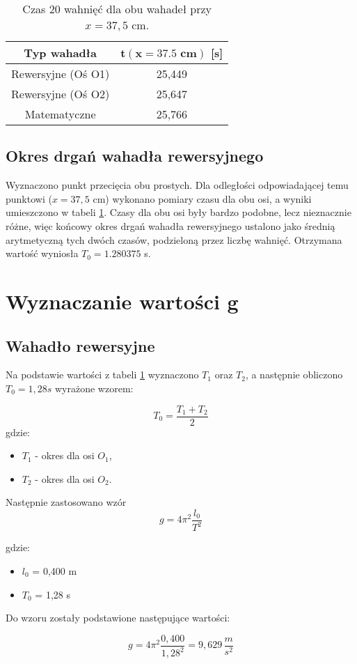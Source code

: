 \documentclass[a4paper,12pt]{article}
\begin{document}
\begin{table}[h]
  \centering
  \begin{tabular}{|c|c|}
    \hline
    \textbf{Typ wahadła} & \textbf{$\mathbf{t(x=37.5\text{ cm})}$ [s]} \\
    \hline
    Rewersyjne (Oś O1) & 25,449 \\
    \hline
    Rewersyjne (Oś O2) & 25,647 \\
    \hline
    Matematyczne & 25,766 \\
    \hline
  \end{tabular}
  \caption{Czas 20 wahnięć dla obu wahadeł przy $x=37,5$ cm.}
  \label{tab:czasy}
\end{table}
\newpage

\subsection{Okres drgań wahadła rewersyjnego}

Wyznaczono punkt przecięcia obu prostych. Dla odległości odpowiadającej temu punktowi ($x=37,5$ cm) wykonano pomiary czasu dla obu osi, a wyniki umieszczono w tabeli \ref{tab:czasy}. Czasy dla obu osi były bardzo podobne, lecz nieznacznie różne, więc końcowy okres drgań wahadła rewersyjnego ustalono jako średnią arytmetyczną tych dwóch czasów, podzieloną przez liczbę wahnięć. Otrzymana wartość wyniosła $T_0 = 1.280375$ s.

\section{Wyznaczanie wartości g}

\subsection{Wahadło rewersyjne}
Na podstawie wartości z tabeli \ref{tab:czasy} wyznaczono $T_1$ oraz $T_2$, a następnie obliczono $T_0=1,28 s$ wyrażone wzorem:\par

$$T_0=\frac{T_1+T_2}{2}$$
gdzie:
\begin{itemize}
  \item \( T_1 \) - okres dla osi $O_1$,
  \item \( T_2 \) - okres dla osi $O_2$.
\end{itemize}\par
Następnie zastosowano wzór
\begin{equation}
  g=4\pi^2\frac{l_0}{T^2}
\end{equation} \par
gdzie:
\begin{itemize}
  \item \( l_0 \) = 0,400 m
  \item \( T_0 \) = 1,28 s
\end{itemize}\par
Do wzoru zostały podstawione następujące wartości:\par
\begin{equation}
  g=4 \pi^2\frac{0,400}{1,28^2}=9,629\,\frac{m}{s^2}
\end{equation} \par
\end{document}
